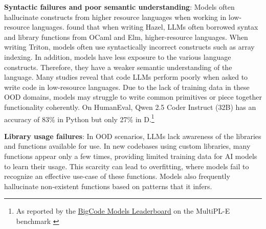 \textbf{Syntactic failures and poor semantic understanding}: Models often hallucinate constructs from higher resource languages when working in low-resource languages. \citet{blinn2024statically} found that when writing Hazel, LLMs often borrowed syntax and library functions from OCaml and Elm, higher-resource languages. When writing Triton, models often use syntactically incorrect constructs such as array indexing.
In addition, models have less exposure to the various language constructs. Therefore, they have a weaker semantic understanding of the language. Many studies reveal that code LLMs perform poorly when asked to write code in low-resource languages. Due to the lack of training data in these OOD domains, models may struggle to write common primitives or piece together functionality coherently. On HumanEval, Qwen 2.5 Coder Instruct (32B) \citep{hui2024qwen2} has an accuracy of 83\% in Python but only 27\% in D.\footnote{As reported by the \href{https://huggingface.co/spaces/bigcode/bigcode-models-leaderboard}{BigCode Models Leaderboard} on the MultiPL-E benchmark \citep{cassano2023multipl}}



\textbf{Library usage failures}: In OOD scenarios, LLMs lack awareness of the libraries and functions available for use. In new codebases using custom libraries, many functions appear only a few times, providing limited training data for AI models to learn their usage. This scarcity can lead to overfitting, where models fail to recognize an effective use-case of these functions. Models also frequently hallucinate non-existent functions based on patterns that it infers.


